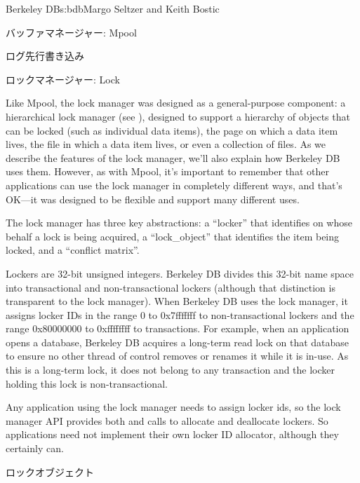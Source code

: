 \begin{aosachapter}{Berkeley DB}{s:bdb}{Margo Seltzer and Keith Bostic}
\begin{aosasect1}{バッファマネージャー: Mpool}
\begin{aosasect2}{ログ先行書き込み}
\end{aosasect2}

\end{aosasect1}

\begin{aosasect1}{ロックマネージャー: Lock}


Like Mpool, the lock manager was designed as a general-purpose
component: a hierarchical lock manager (see \cite{bib:gray:lock}),
designed to support a hierarchy of objects that can be locked (such as
individual data items), the page on which a data item lives, the file
in which a data item lives, or even a collection of files. As we
describe the features of the lock manager, we'll also explain how
Berkeley DB uses them.  However, as with Mpool, it's important to
remember that other applications can use the lock manager in
completely different ways, and that's OK---it was designed to be
flexible and support many different uses.

The lock manager has three key abstractions: a ``locker'' that identifies
on whose behalf a lock is being acquired, a ``lock\_object'' that
identifies the item being locked, and a ``conflict matrix''.

Lockers are 32-bit unsigned integers. Berkeley DB divides this 32-bit
name space into transactional and non-transactional lockers (although
that distinction is transparent to the lock manager).  When Berkeley
DB uses the lock manager, it assigns locker IDs in the range 0 to
0x7fffffff to non-transactional lockers and the range 0x80000000 to
0xffffffff to transactions. For example, when an application opens a
database, Berkeley DB acquires a long-term read lock on that database
to ensure no other thread of control removes or renames it while it is
in-use. As this is a long-term lock, it does not belong to any
transaction and the locker holding this lock is non-transactional.

Any application using the lock manager needs to assign locker ids, so
the lock manager API provides both 
and  calls to allocate and
deallocate lockers.  So applications need not implement
their own locker ID allocator, although they certainly can.

\begin{aosasect2}{ロックオブジェクト}


\end{aosasect2}
\end{aosasect1}
\end{aosachapter}
